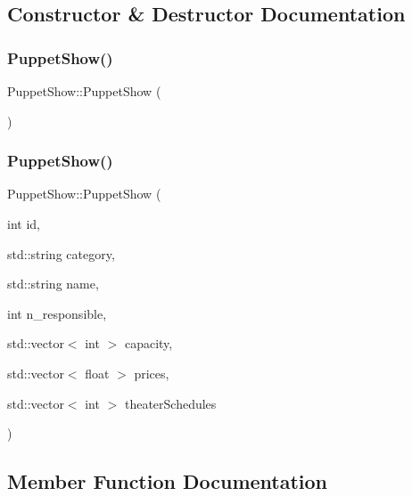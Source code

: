 \subsection{Constructor \& Destructor Documentation}
\mbox{\label{class_puppet_show_a7289fbaf279023c6198880b580c2d69d}} 
\subsubsection{\texorpdfstring{Puppet\+Show()}{PuppetShow()}\hspace{0.1cm}{\footnotesize\ttfamily [1/2]}}
{\footnotesize\ttfamily Puppet\+Show\+::\+Puppet\+Show (\begin{DoxyParamCaption}{ }\end{DoxyParamCaption})}

\mbox{\label{class_puppet_show_a5e2a9ecaba3174d380a0c02a020672a9}} 
\subsubsection{\texorpdfstring{Puppet\+Show()}{PuppetShow()}\hspace{0.1cm}{\footnotesize\ttfamily [2/2]}}
{\footnotesize\ttfamily Puppet\+Show\+::\+Puppet\+Show (\begin{DoxyParamCaption}\item[{int}]{id,  }\item[{std\+::string}]{category,  }\item[{std\+::string}]{name,  }\item[{int}]{n\+\_\+responsible,  }\item[{std\+::vector$<$ int $>$}]{capacity,  }\item[{std\+::vector$<$ float $>$}]{prices,  }\item[{std\+::vector$<$ int $>$}]{theater\+Schedules }\end{DoxyParamCaption})}



\subsection{Member Function Documentation}
\mbox{\label{class_puppet_show_a446ad8e871ff4182604d2f19450a5ca0}} 
